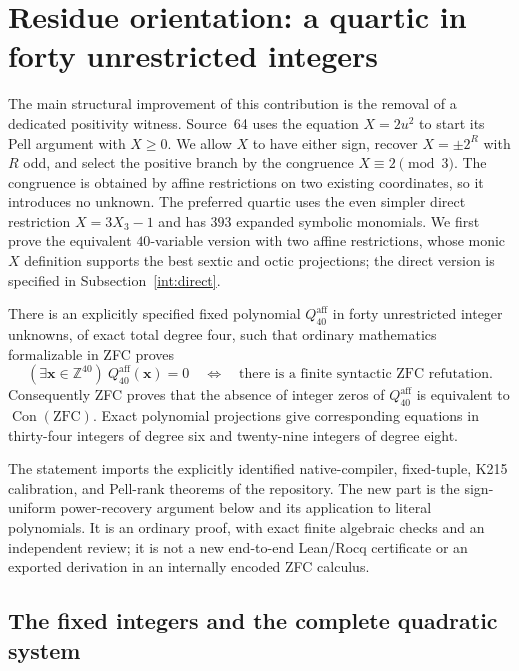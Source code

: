 \section{Residue orientation: a quartic in forty unrestricted integers}
\label{int:main}

The main structural improvement of this contribution is the removal of a
dedicated positivity witness.  Source~64 uses the equation $X=2u^2$ to
start its Pell argument with $X\geq0$.  We allow $X$ to have either sign,
recover $X=\pm2^R$ with $R$ odd, and select the positive branch by the
congruence $X\equiv2\pmod3$.  The congruence is obtained by affine
restrictions on two existing coordinates, so it introduces no unknown.
The preferred quartic uses the even simpler direct restriction
$X=3X_3-1$ and has $393$ expanded symbolic monomials.  We first prove the
equivalent $40$-variable version with two affine restrictions, whose monic
$X$ definition supports the best sextic and octic projections; the direct
version is specified in Subsection~\ref{int:direct}.

\begin{theorem}\label{int:theorem}
There is an explicitly specified fixed polynomial $Q_{40}^{\mathrm{aff}}$ in forty
unrestricted integer unknowns, of exact total degree four, such that
ordinary mathematics formalizable in ZFC proves
\[
  (\exists\mathbf x\in\mathbb Z^{40})\ Q_{40}^{\mathrm{aff}}(\mathbf x)=0
  \quad\Longleftrightarrow\quad
  \text{there is a finite syntactic ZFC refutation}.
\]
Consequently ZFC proves that the absence of integer zeros of $Q_{40}^{\mathrm{aff}}$
is equivalent to $\operatorname{Con}(\mathrm{ZFC})$.
Exact polynomial projections give corresponding equations in thirty-four
integers of degree six and twenty-nine integers of degree eight.
\end{theorem}

The statement imports the explicitly identified native-compiler, fixed-tuple,
K215 calibration, and Pell-rank theorems of the repository.  The new part is
the sign-uniform power-recovery argument below and its application to literal
polynomials.  It is an ordinary proof, with exact finite algebraic checks
and an independent review; it is not a new end-to-end Lean/Rocq certificate
or an exported derivation in an internally encoded ZFC calculus.

\subsection{The fixed integers and the complete quadratic system}
\label{int:literal}

